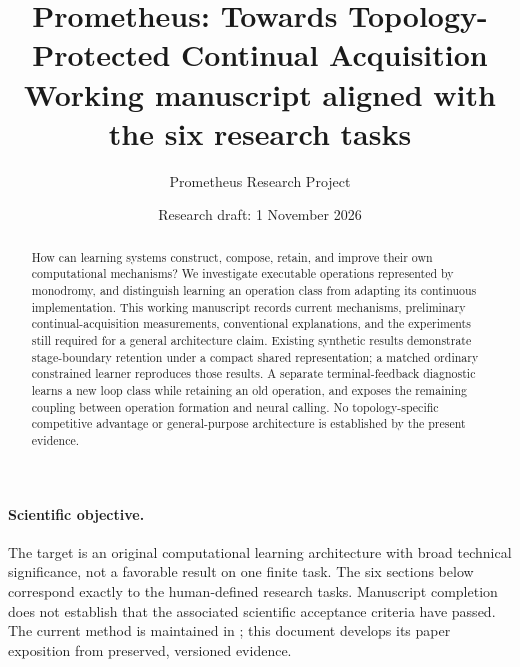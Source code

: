 \documentclass[11pt]{article}
\title{Prometheus: Towards Topology-Protected Continual Acquisition\\
\large Working manuscript aligned with the six research tasks}
\author{Prometheus Research Project}
\date{Research draft: 1 November 2026}
\begin{document}
\maketitle
\begin{abstract}
How can learning systems construct, compose, retain, and improve their own
computational mechanisms? We investigate executable operations represented by
monodromy, and distinguish learning an operation class from adapting its
continuous implementation. This working manuscript records current mechanisms,
preliminary continual-acquisition measurements, conventional explanations, and
the experiments still required for a general architecture claim. Existing
synthetic results demonstrate stage-boundary retention under a compact shared
representation; a matched ordinary constrained learner reproduces those results.
A separate terminal-feedback diagnostic learns a new loop class while retaining
an old operation, and exposes the remaining coupling between operation formation
and neural calling. No topology-specific competitive advantage or general-purpose
architecture is established by the present evidence.
\end{abstract}

\paragraph{Scientific objective.}
The target is an original computational learning architecture with broad technical
significance, not a favorable result on one finite task. The six sections below
correspond exactly to the human-defined research tasks. Manuscript completion
does not establish that the associated scientific acceptance criteria have passed.
The current method is maintained in ; this document develops
its paper exposition from preserved, versioned evidence.

\tableofcontents






\end{document}
